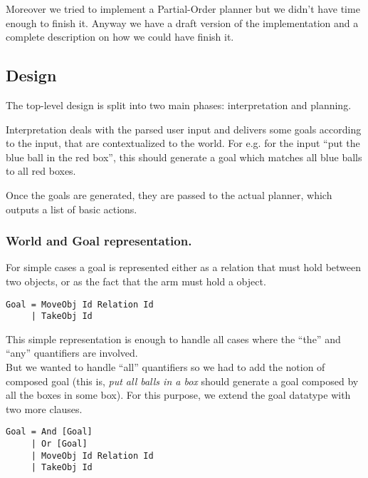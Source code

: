 \documentclass[11pt]{article}
\begin{document}
        Moreover we tried to implement a Partial-Order planner but we didn't have 
        time enough to finish it.  Anyway we have a draft version of the 
        implementation and a complete description on how we could have finish 
        it.  \\

	\subsection{Design}

	The top-level design is split into two main phases: interpretation and 
	planning.

	Interpretation deals with the parsed user input and delivers some goals 
	according to the input, that are contextualized to the world. For e.g. for the 
	input ``put the blue ball in the red box'', this should generate a goal 
	which matches all blue balls to all red boxes.
	
	Once the goals are generated, they are passed to the actual planner, which 
	outputs a list of basic actions.

	\subsubsection{World and Goal representation.}
        
        For simple cases a goal is represented either as a relation that must 
        hold between two objects, or as the fact that the arm must hold 
        a object.  \\

\begin{verbatim}
Goal = MoveObj Id Relation Id
     | TakeObj Id 
\end{verbatim}

        This simple representation is enough to handle all cases where the ``the'' and
        ``any'' quantifiers are involved.  \\

        But we wanted to handle ``all'' quantifiers so we had to add the notion of 
        composed goal (this is, \textit{put all balls
        in a box} should generate a goal composed by all the boxes in some box). For 
        this purpose, we extend the goal datatype with two more clauses.  \\

\begin{verbatim}
Goal = And [Goal]
     | Or [Goal]
     | MoveObj Id Relation Id
     | TakeObj Id 
\end{verbatim}
\end{document}
